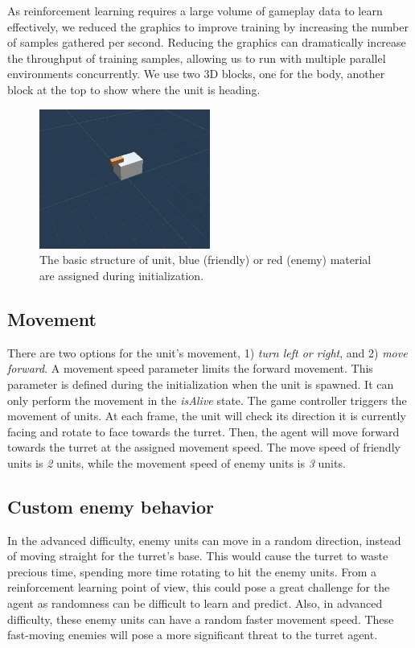 \documentclass[conference]{IEEEtran}
\begin{document}
As reinforcement learning requires a large volume of gameplay data to learn effectively, we reduced the graphics to improve training by increasing the number of samples gathered per second. Reducing the graphics can dramatically increase the throughput of training samples, allowing us to run with multiple parallel environments concurrently. We use two 3D blocks, one for the body, another block at the top to show where the unit is heading.

\begin{figure}[h]
\centerline{\includegraphics[width=0.5\textwidth]{assets/tank}}
\caption{The basic structure of unit, blue (friendly) or red (enemy) material are assigned during initialization.}
\label{tank}
\end{figure}

\subsection{Movement}

There are two options for the unit's movement, 1) \textit{turn left or right}, and 2) \textit{move forward}. A movement speed parameter limits the forward movement. This parameter is defined during the initialization when the unit is spawned. It can only perform the movement in the \textit{isAlive} state. The game controller triggers the movement of units. At each frame, the unit will check its direction it is currently facing and rotate to face towards the turret. Then, the agent will move forward towards the turret at the assigned movement speed. The move speed of friendly units is \textit{2} units, while the movement speed of enemy units is \textit{3} units. 

\subsection{Custom enemy behavior}

In the advanced difficulty, enemy units can move in a random direction, instead of moving straight for the turret's base. This would cause the turret to waste precious time, spending more time rotating to hit the enemy units. From a reinforcement learning point of view, this could pose a great challenge for the agent as randomness can be difficult to learn and predict. Also, in advanced difficulty, these enemy units can have a random faster movement speed. These fast-moving enemies will pose a more significant threat to the turret agent.
\end{document}
